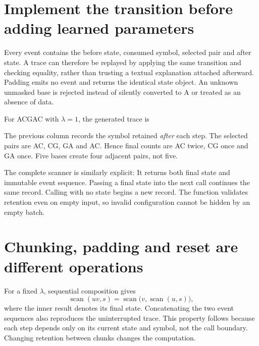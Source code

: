 \section{Implement the transition before adding learned parameters}
Every event contains the before state, consumed symbol, selected pair and
after state. A trace can therefore be replayed by applying the same transition
and checking equality, rather than trusting a textual explanation attached
afterward. Padding emits no event and returns the identical state object.
An unknown unmasked base is rejected instead of silently converted to A or
treated as an absence of data.

For ACGAC with $\lambda=1$, the generated trace is
\begin{center}\end{center}
The previous column records the symbol retained \emph{after} each step.
The selected pairs are AC, CG, GA and AC. Hence final counts are AC twice,
CG once and GA once. Five bases create four adjacent pairs, not five.

The complete scanner is similarly explicit:
It returns both final state and immutable event sequence. Passing a final
state into the next call continues the same record. Calling with no state
begins a new record. The function validates retention even on empty input,
so invalid configuration cannot be hidden by an empty batch.

\section{Chunking, padding and reset are different operations}
For a fixed $\lambda$, sequential composition gives
\begin{equation}
 \operatorname{scan}(uv,s)=
 \operatorname{scan}\bigl(v,\operatorname{scan}(u,s)\bigr),
 \label{eq:chunk}
\end{equation}
where the inner result denotes its final state. Concatenating the two event
sequences also reproduces the uninterrupted trace. This property follows
because each step depends only on its current state and symbol, not the
call boundary. Changing retention between chunks changes the computation.


